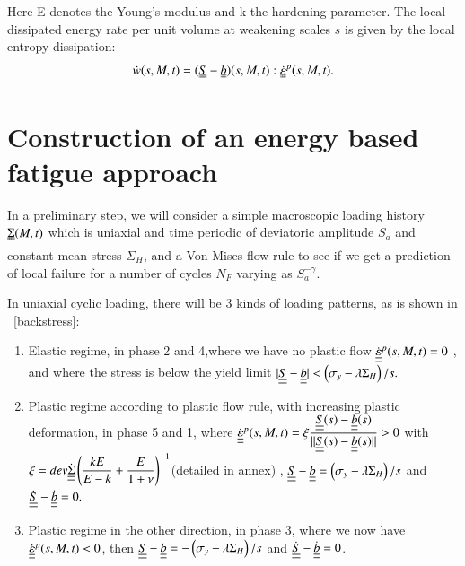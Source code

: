 \documentclass[3p,times,number,review]{elsarticle}
\newcommand{\figref}[1]{\figurename~\ref{#1}}
\begin{document}
Here E denotes the Young's modulus and k the hardening parameter. The local dissipated energy rate per unit volume at weakening scales $s$  is given by the local entropy dissipation:
\begin{equation}
\dot{w}(s,M,t)=(\uuline{S}-\uuline{b})(s,M,t):\uuline{\dot{\varepsilon}}^p(s,M,t).
\label{dissipated}
\end{equation}

\section{Construction of an energy based fatigue approach}
\label{sec:5.5}
In a preliminary step, we will consider a simple macroscopic loading history $\uuline{\Sigma}(M, t)$ which is uniaxial
and time periodic of deviatoric amplitude $S_{a}$ and constant mean stress $\Sigma_{H}$, and a Von Mises flow rule to see if we get a prediction of local failure for a number of cycles $N_F$ varying as $S_{a}^{-\gamma}.$

In uniaxial cyclic loading, there will be 3 kinds of loading patterns, as is shown in \figref{backstress}:

\vspace{6pt}
\begin{enumerate}

\item	Elastic regime, in phase 2 and 4,where we have no plastic flow $\dot{\uline{\uline{\varepsilon}}}^p(s,M,t)=0$ ,  and where the stress is below the yield limit $|\uline{\uline{S}}-\uline{\uline{b}}|< \left( \sigma_y-\lambda \Sigma_H\right)/s. $ 
\vspace{6pt}

\item Plastic regime according to plastic flow rule, with increasing plastic deformation, in phase 5 and 1, where	$\dot{\uline{\uline{\varepsilon}}}^p(s,M,t)=\xi\dfrac{\uline{\uline{S}}(s)-\uline{\uline{b}}(s)}{||\uline{\uline{S}}(s)-\uline{\uline{b}}(s)||}> 0$ with  $\xi= dev\dot{\uline{\uline{\Sigma}}}\left(\dfrac{kE}{E-k}+\dfrac{E}{1+\nu} \right) ^{-1}$(detailed in annex) ,  $\uline{\uline{S}}-\uline{\uline{b}}= \left(\sigma_y-\lambda \Sigma_H\right)/s$ and $\dot{\uline{\uline{S}}}-\dot{\uline{\uline{b}}}=0.$ 
\vspace{6pt}

\item Plastic regime in the other direction, in phase 3, where we now have	$\dot{\uline{\uline{\varepsilon}}}^p(s,M,t)<0$,  then $\uline{\uline{S}}-\uline{\uline{b}}=- \left(\sigma_y-\lambda \Sigma_H\right)/s$ and $\dot{\uline{\uline{S}}}-\dot{\uline{\uline{b}}}=0$.

\end{enumerate}	
\end{document}

